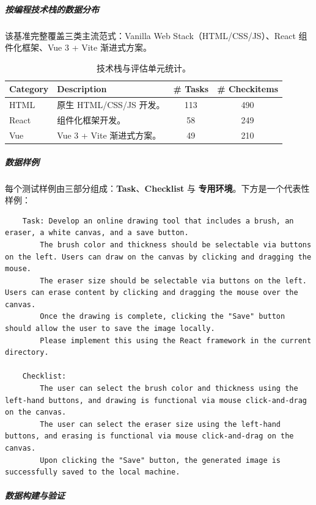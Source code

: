\subparagraph{按编程技术栈的数据分布}
该基准完整覆盖三类主流范式：Vanilla Web Stack（HTML/CSS/JS）、React 组件化框架、Vue 3 + Vite 渐进式方案。
\begin{table}[h]
\centering
\caption{技术栈与评估单元统计。}
\begin{tabular}{llcc}
\toprule
\textbf{Category} & \textbf{Description} & \textbf{\# Tasks} & \textbf{\# Checkitems} \\
\midrule
HTML & 原生 HTML/CSS/JS 开发。 & 113 & 490 \\
React & 组件化框架开发。 & 58 & 249 \\
Vue & Vue 3 + Vite 渐进式方案。 & 49 & 210 \\
\bottomrule
\end{tabular}
\end{table}

\subparagraph{数据样例}
每个测试样例由三部分组成：\textbf{Task}、\textbf{Checklist} 与 \textbf{专用环境}。下方是一个代表性样例：
\begin{tcolorbox}[left=0mm,right=0mm,top=0mm,bottom=0mm,boxsep=1mm,arc=0mm,boxrule=0pt, frame empty, breakable]
\footnotesize
\begin{lstlisting}
    Task: Develop an online drawing tool that includes a brush, an eraser, a white canvas, and a save button.
        The brush color and thickness should be selectable via buttons on the left. Users can draw on the canvas by clicking and dragging the mouse.
        The eraser size should be selectable via buttons on the left. Users can erase content by clicking and dragging the mouse over the canvas.
        Once the drawing is complete, clicking the "Save" button should allow the user to save the image locally.
        Please implement this using the React framework in the current directory.

    Checklist:
        The user can select the brush color and thickness using the left-hand buttons, and drawing is functional via mouse click-and-drag on the canvas.
        The user can select the eraser size using the left-hand buttons, and erasing is functional via mouse click-and-drag on the canvas.
        Upon clicking the "Save" button, the generated image is successfully saved to the local machine.
\end{lstlisting}
\end{tcolorbox}
\noindent\begin{minipage}{\textwidth}
\end{minipage}


\subparagraph{\textbf{数据构建与验证}}

